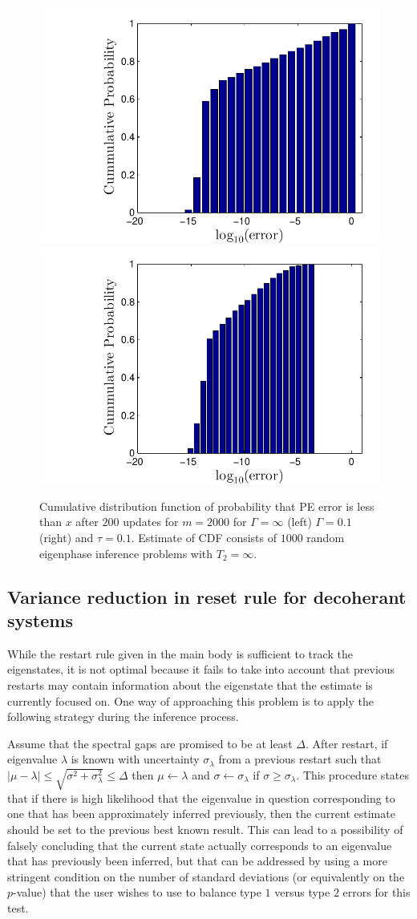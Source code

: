\documentclass[aps,pra,amsmath,twocolumn,amssymb,superscriptaddress]{revtex4-1}
\begin{document}
{\begin{figure}
    \begin{centering}
        \includegraphics[width=0.35\linewidth]{restartNone.pdf}
        \includegraphics[width=0.35\linewidth]{restartp10.pdf}
    \end{centering}
    \caption{\label{fig:restart}
     Cumulative distribution function of probability that PE error is less than $x$ after $200$ updates for $m=2000$ for $\Gamma=\infty$ (left) $\Gamma=0.1$ (right) and $\tau=0.1$.  Estimate of CDF consists of $1000$ random eigenphase inference problems with $T_2=\infty$.
    }
\end{figure}

\subsection{Variance reduction in reset rule for decoherant systems}
While the restart rule given in the main body is sufficient to track the eigenstates, it is not optimal because it fails to take into account that previous restarts may contain information about the eigenstate that the estimate is currently focused on.  One way of approaching this problem is to apply the following strategy during the inference process.  

Assume that the spectral gaps are promised to be at least $\Delta$.
After restart, if eigenvalue $\lambda$ is known with uncertainty $\sigma_\lambda$ from a previous restart such that $|\mu-\lambda| \le \sqrt{\sigma^2 + \sigma_\lambda^2}\le \Delta$ then $\mu\gets \lambda$ and $\sigma\gets \sigma_\lambda$ if $\sigma \ge \sigma_\lambda$.  This procedure states that if there is high likelihood that the eigenvalue in question corresponding to one that has been approximately inferred previously, then the current estimate should be set to the previous best known result.  This can lead to a possibility of falsely concluding that the current state actually corresponds to an eigenvalue that has previously been inferred, but that can be addressed by using a more stringent condition on the number of standard deviations (or equivalently on the $p$-value) that the user wishes to use to balance type $1$ versus type $2$ errors for this test.


}
\end{document}
